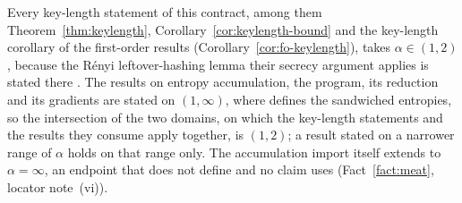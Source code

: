 
\begin{remark}\label{rem:alpha-domain}
Every key-length statement of this contract, among them
Theorem~\ref{thm:keylength}, Corollary~\ref{cor:keylength-bound} and the
key-length corollary of the first-order results
(Corollary~\ref{cor:fo-keylength}), takes $\alpha\in(1,2)$, because the
R\'enyi leftover-hashing lemma their secrecy argument applies is stated
there \cite[Thm.~4, Eq.~(13)]{kamin2025renyi}. The results on entropy
accumulation, the program, its reduction and its gradients are stated on
$(1,\infty)$, where  defines the sandwiched
entropies, so the intersection of the two domains, on which the key-length
statements and the results they consume apply together, is $(1,2)$; a
result stated on a narrower range of $\alpha$ holds on that range only. The
accumulation import itself extends to $\alpha=\infty$, an endpoint that
 does not define and no claim uses
(Fact~\ref{fact:meat}, locator note~(vi)).
\end{remark}
